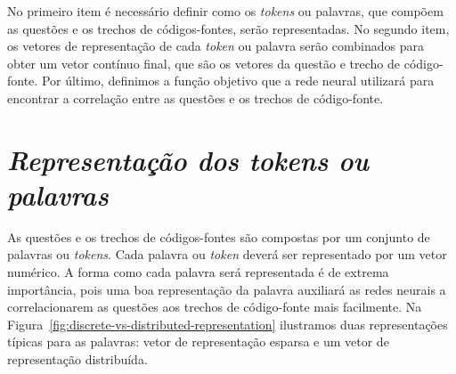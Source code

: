 No primeiro item é necessário definir como os \textit{tokens} ou palavras, que compõem as questões e os trechos de códigos-fontes, serão representadas. No segundo item, os vetores de representação de cada \textit{token} ou palavra serão combinados para obter um vetor contínuo final, que são os vetores da questão e trecho de código-fonte. Por último, definimos a função objetivo que a rede neural utilizará para encontrar a correlação entre as questões e os trechos de código-fonte.


\section{\textit{Representação dos \textit{tokens} ou palavras}}
\label{sec:fundamentao-representacao-tokens-palavras}

As questões e os trechos de códigos-fontes são compostas por um conjunto de palavras ou \textit{tokens}. Cada palavra ou \textit{token} deverá ser representado por um vetor numérico. A forma como cada palavra será representada é de extrema importância, pois uma boa representação da palavra auxiliará as redes neurais a correlacionarem as questões aos trechos de código-fonte mais facilmente. Na Figura~\ref{fig:discrete-vs-distributed-representation} ilustramos duas representações típicas para as palavras: vetor de representação esparsa e um vetor de representação distribuída.


